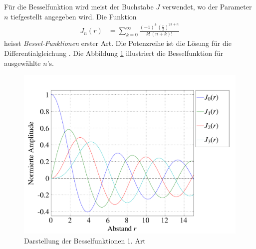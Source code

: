 F\"ur die Besselfunktion wird meist der Buchstabe $J$ verwendet,
wo der Parameter $n$ tiefgestellt angegeben wird.
Die Funktion
\begin{align}
	J_n \left( r \right)
	&=
	\sum_{k=0} ^{\infty}
	\frac
	{
		\displaystyle
		\left( - 1 \right) ^k \, 
		\left(		
		\frac
		{
			r
		}{
			2
		} \right) ^{2k+n}
	}{
		{k}! \, { \left( n + k \right) }!
	}
	\label{eq:bessel:summenformel}
\end{align}
heisst \emph{Bessel-Funktionen} erster Art.
Die Potenzreihe  ist die L\"osung f\"ur die Differentialgleichung .
Die Abbildung \ref{img:besselfunction} illustriert die Besselfunktion  f\"ur ausgew\"ahlte $n$'s.
\begin{figure}
	\begin{center}
		\includegraphics[scale=0.5]{kreis/besselfunction.pdf}
		\caption[Besselfunktion 1. Art]{Darstellung der Besselfunktionen 1. Art}
		\label{img:besselfunction}
	\end{center}
\end{figure}
